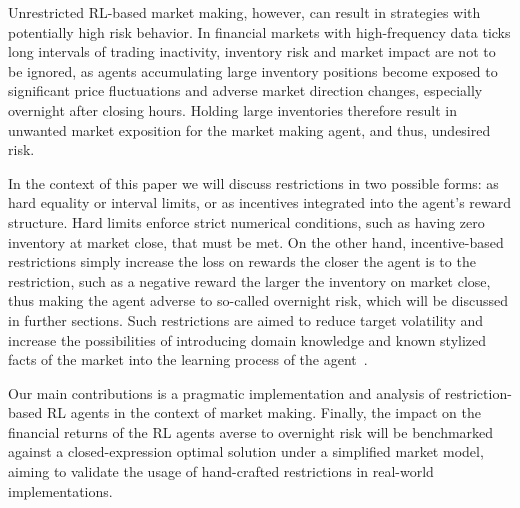 Unrestricted RL-based market making, however, can result in strategies with potentially high risk behavior.
In financial markets with high-frequency data ticks long intervals of trading inactivity, inventory risk and market impact are not to be ignored,
as agents accumulating large inventory positions become exposed to significant price fluctuations and adverse market direction changes, especially overnight after closing hours.
Holding large inventories therefore result in unwanted market exposition for the market making agent, and thus, undesired risk.

In the context of this paper we will discuss restrictions in two possible forms:
as hard equality or interval limits, or as incentives integrated into the agent's reward structure.
Hard limits enforce strict numerical conditions, such as having zero inventory at market close, that must be met.
On the other hand, incentive-based restrictions simply increase the loss on rewards the closer the agent is to the restriction,
such as a negative reward the larger the inventory on market close, thus making the agent adverse to so-called overnight risk,
which will be discussed in further sections.
Such restrictions are aimed to reduce target volatility and increase the possibilities of introducing domain knowledge
and known stylized facts of the market into the learning process of the agent~\cite{Jerome2022, Selser2021}.

Our main contributions is a pragmatic implementation and analysis of restriction-based RL agents in the context of market making.
Finally, the impact on the financial returns of the RL agents averse to overnight risk will be
benchmarked against a closed-expression optimal solution under a simplified market model,
aiming to validate the usage of hand-crafted restrictions in real-world implementations.
